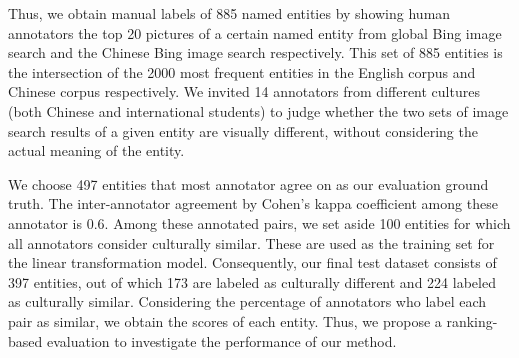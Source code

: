 %


Thus, we obtain manual labels of 885 named
entities by
showing human annotators the top 20 pictures of a certain
named entity from global Bing image search and the Chinese Bing image
search respectively.
This set of 885 entities is the intersection of the 2000 most frequent
entities in the English corpus and Chinese corpus respectively.
We invited 14 annotators from different cultures (both Chinese and
international students) to judge whether the two sets of image search results
of a given entity are visually different, without considering the actual
meaning of the entity.


We choose 497 entities that most annotator agree on as
our evaluation ground truth. The inter-annotator  agreement by
Cohen's kappa coefficient among these annotator is 0.6.
Among these annotated pairs,
we set aside 100 entities for which all annotators consider culturally similar.
These are used as the training set for the linear transformation model.
Consequently, our final test dataset consists of 397 entities,
out of which 173 are labeled as culturally different and 224 labeled
as culturally similar. Considering the percentage of annotators who label each pair as similar, we obtain the scores of each entity. 
Thus, we propose a ranking-based evaluation to investigate the performance of our method.


